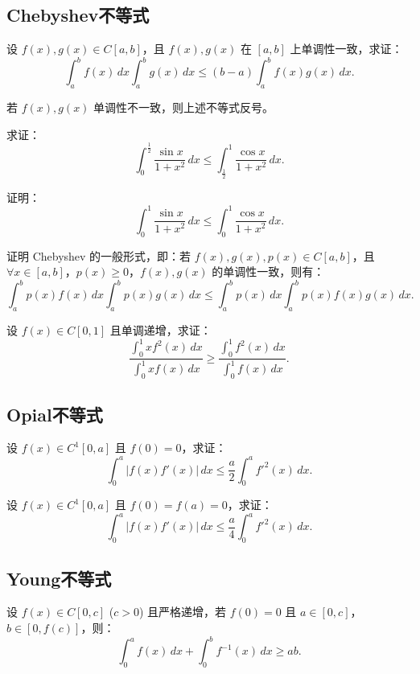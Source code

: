 \documentclass[lang=cn,10pt,thmcnt=section]{elegantbook}
\begin{document}
\subsection{Chebyshev不等式}
\begin{example}[Chebyshev不等式]
	设 \( f(x), g(x) \in C[a, b] \)，且 \( f(x), g(x) \) 在 \([a, b]\) 上单调性一致，求证：
\[
\int_a^b f(x) \, dx \int_a^b g(x) \, dx \leq (b - a) \int_a^b f(x) g(x) \, dx.
\]
\end{example}
\begin{remark}
	若 \( f(x), g(x) \) 单调性不一致，则上述不等式反号。
\end{remark}
\begin{example}
	求证：
\[
\int_0^{\frac{1}{2}} \frac{\sin x}{1 + x^2} \, dx \leq \int_{\frac{1}{2}}^1 \frac{\cos x}{1 + x^2} \, dx.
\]
\end{example}
\begin{example}
	证明：
\[
\int_0^1 \frac{\sin x}{1 + x^2} \, dx \leq \int_0^1 \frac{\cos x}{1 + x^2} \, dx.
\]
\end{example}
\begin{example}
	证明 Chebyshev 的一般形式，即：若 \( f(x), g(x), p(x) \in C[a, b] \)，且 \(\forall x \in [a, b]\)，\( p(x) \geq 0 \)，\( f(x), g(x) \) 的单调性一致，则有：
\[
\int_a^b p(x) f(x) \, dx \int_a^b p(x) g(x) \, dx \leq \int_a^b p(x) \, dx \int_a^b p(x) f(x) g(x) \, dx.
\]
\end{example}
\begin{example}
	设 \( f(x) \in C[0,1] \) 且单调递增，求证：
\[
\frac{\int_0^1 x f^2(x) \, dx}{\int_0^1 x f(x) \, dx} \geq \frac{\int_0^1 f^2(x) \, dx}{\int_0^1 f(x) \, dx}.
\]
\end{example}
\subsection{Opial不等式}
\begin{example}[Opial不等式]
	设 \( f(x) \in C^1[0, a] \) 且 \( f(0) = 0 \)，求证：
\[
\int_0^a |f(x) f'(x)| \, dx \leq \frac{a}{2} \int_0^a f'^2(x) \, dx.
\]
\end{example}
\begin{example}
	设 \( f(x) \in C^1[0, a] \) 且 \( f(0) = f(a) = 0 \)，求证：
\[
\int_0^a |f(x) f'(x)| \, dx \leq \frac{a}{4} \int_0^a f'^2(x) \, dx.
\]
\end{example}
\subsection{Young不等式}
\begin{example}
	设 \( f(x) \in C[0, c] \) (\( c > 0 \)) 且严格递增，若 \( f(0) = 0 \) 且 \( a \in [0, c] \)，\( b \in [0, f(c)] \)，则：
\[
\int_0^a f(x) \, dx + \int_0^b f^{-1}(x) \, dx \geq ab.
\]
\end{example}
\end{document}
